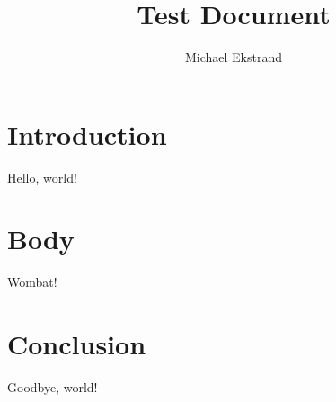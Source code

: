 \documentclass[12pt,letterpaper]{article}
\title{Test Document}
\author{Michael Ekstrand}
\begin{document}
\maketitle
\tableofcontents

\section{Introduction}
Hello, world!

\section{Body}
Wombat!

\section{Conclusion}
Goodbye, world!
\end{document}
